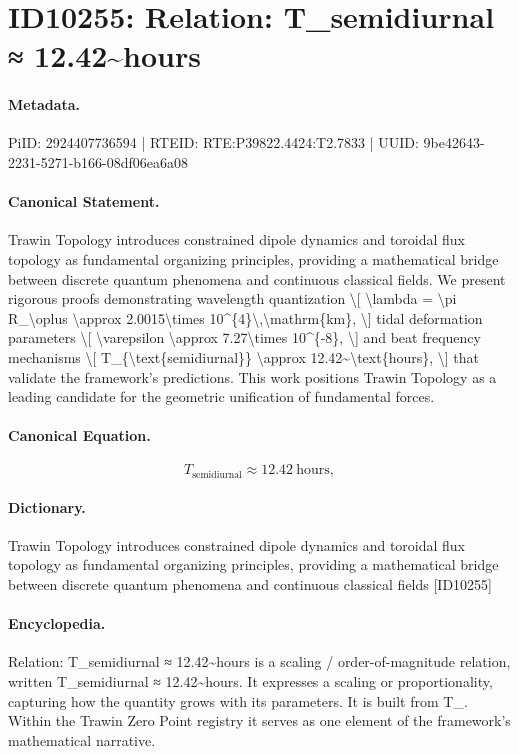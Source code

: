 \section*{ID10255: Relation: T\_semidiurnal ≈ 12.42\textasciitilde{}hours}
\paragraph{Metadata.}
PiID: 2924407736594 | RTEID: RTE:P39822.4424:T2.7833 | UUID: 9be42643-2231-5271-b166-08df06ea6a08

\paragraph{Canonical Statement.}
Trawin Topology introduces constrained dipole dynamics and toroidal flux topology as fundamental organizing principles, providing a mathematical bridge between discrete quantum phenomena and continuous classical fields. We present rigorous proofs demonstrating wavelength quantization \textbackslash{}[ \textbackslash{}lambda = \textbackslash{}pi R\_\textbackslash{}oplus \textbackslash{}approx 2.0015\textbackslash{}times 10\textasciicircum{}\{4\}\textbackslash{},\textbackslash{}mathrm\{km\}, \textbackslash{}] tidal deformation parameters \textbackslash{}[ \textbackslash{}varepsilon \textbackslash{}approx 7.27\textbackslash{}times 10\textasciicircum{}\{-8\}, \textbackslash{}] and beat frequency mechanisms \textbackslash{}[ T\_\{\textbackslash{}text\{semidiurnal\}\} \textbackslash{}approx 12.42\textasciitilde{}\textbackslash{}text\{hours\}, \textbackslash{}] that validate the framework's predictions. This work positions Trawin Topology as a leading candidate for the geometric unification of fundamental forces.

\paragraph{Canonical Equation.}
\[
T_{\text{semidiurnal}} \approx 12.42~\text{hours},
\]

\paragraph{Dictionary.}
Trawin Topology introduces constrained dipole dynamics and toroidal flux topology as fundamental organizing principles, providing a mathematical bridge between discrete quantum phenomena and continuous classical fields [ID10255]

\paragraph{Encyclopedia.}
Relation: T\_semidiurnal ≈ 12.42\textasciitilde{}hours is a scaling / order-of-magnitude relation, written T\_semidiurnal ≈ 12.42\textasciitilde{}hours. It expresses a scaling or proportionality, capturing how the quantity grows with its parameters. It is built from T\_. Within the Trawin Zero Point registry it serves as one element of the framework's mathematical narrative.
